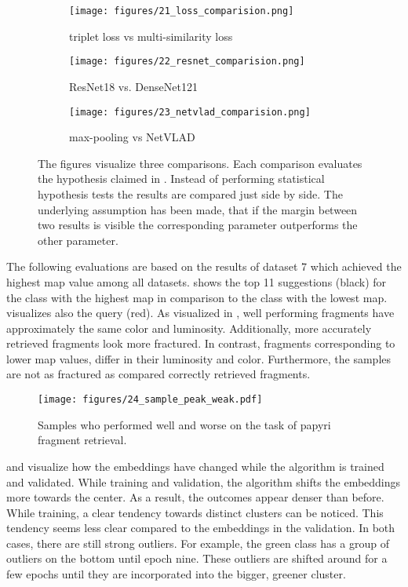 \begin{figure}[t]
	\centering
	\begin{subfigure}{.32\textwidth}
		\centering
		\texttt{[image: figures/21\_loss\_comparision.png]}
		\caption{triplet loss vs multi-similarity loss}
		\label{fig:loss_comparision}
	\end{subfigure}%
	\begin{subfigure}{.32\textwidth}
		\centering
		\texttt{[image: figures/22\_resnet\_comparision.png]}
		\caption{ResNet18 vs. DenseNet121}
		\label{fig:resnet_comparision}
	\end{subfigure}
	\begin{subfigure}{.32\textwidth}
		\centering
		\texttt{[image: figures/23\_netvlad\_comparision.png]}
		\caption{max-pooling vs NetVLAD}
		\label{fig:netvlad_comparision}	
	\end{subfigure}
	\caption{The figures visualize three comparisons. Each comparison evaluates the hypothesis claimed in . Instead of performing statistical hypothesis tests the results are compared just side by side. The underlying assumption has been made, that if the margin between two results is visible the corresponding parameter outperforms the other parameter.}
	\label{fig:hypothesis_testing}
\end{figure}
%
\noindent The following evaluations are based on the results of dataset 7 which achieved the highest \ac{map} value among all datasets.  shows the top 11 suggestions (black) for the class with the highest \ac{map} in comparison to the class with the lowest \ac{map}.  visualizes also the query (red). As visualized in , well performing fragments have approximately the same color and luminosity. Additionally, more accurately retrieved fragments look more fractured. In contrast, fragments corresponding to lower \ac{map} values, differ in their luminosity and color. Furthermore, the samples are not as fractured as compared correctly retrieved fragments.\\

\begin{figure}[t]
	\centering
	\texttt{[image: figures/24\_sample\_peak\_weak.pdf]}
	\caption{Samples who performed well and worse on the task of papyri fragment retrieval.}
	\label{fig:performance}
\end{figure} 
%
\noindent {} and  visualize how the embeddings have changed while the algorithm is trained and validated. While training and validation, the algorithm shifts the embeddings more towards the center. As a result, the outcomes appear denser than before. While training, a clear tendency towards distinct clusters can be noticed. This tendency seems less clear compared to the embeddings in the validation. In both cases, there are still strong outliers. For example, the green class has a group of outliers on the bottom until epoch nine. These outliers are shifted around for a few epochs until they are incorporated into the bigger, greener cluster.\\  

